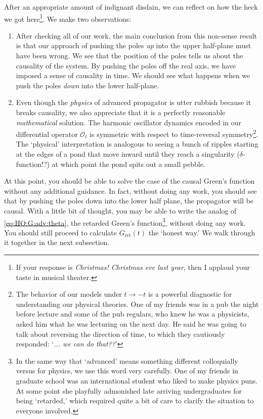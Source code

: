 After an appropriate amount of indignant disdain, we can reflect on how the heck we got here\footnote{If your response is \emph{Christmas! Christmas eve last year}, then I applaud your taste in musical theater.}. We make two observations:
\begin{enumerate}
\item After checking all of our work, the main conclusion from this non-sense result is that our approach of pushing the poles \emph{up} into the upper half-plane must have been wrong. We see that the position of the poles tells us about the causality of the system. By pushing the poles off the real axis, we have imposed a sense of causality in time. We should see what happens when we push the poles \emph{down} into the lower half-plane. 

\item Even though the \emph{physics} of advanced propagator is utter rubbish because it breaks causality, we also appreciate that it is a perfectly reasonable \emph{mathematical} solution. The harmonic oscillator dynamics encoded in our differential operator $\mathcal O_t$ is symmetric with respect to time-reversal symmetry\footnote{The behavior of our models under $t\to -t$ is a powerful diagnostic for understanding our physical theories. One of my friends was in a pub the night before lecture and some of the pub regulars, who knew he was a physicists, asked him what he was lecturing on the next day. He said he was going to talk about reversing the direction of time, to which they cautiously responded: `\emph{... we can do that??}'}. The `physical' interpretation is analogous to seeing a bunch of ripples starting at the edges of a pond that move inward until they reach a singularity ($\delta$-function!?) at which point the pond spits out a small pebble. 
\end{enumerate}


\begin{exercise}
At this point, you should be able to solve the case of the causal Green's function without any additional guidance. In fact, without doing any work, you should see that by pushing the poles down into the lower half plane, the propagator will be causal. With a little bit of thought, you may be able to write the analog of \eqref{eq:HO:G:adv:theta}, the retarded Green's function\footnote{In the same way that `advanced' means something different colloquially versus for physics, we use this word very carefully. One of my friends in graduate school was an international student who liked to make physics puns. At some point she playfully admonished late arriving undergraduates for being `retarded,' which required quite a bit of care to clarify the situation to everyone involved.}, without doing any work. You should still proceed to calculate $G_\text{ret}(t)$ the `honest way.' We walk  through it together in the next subsection. 
\label{ex:retarded:G:HO}
\end{exercise}


